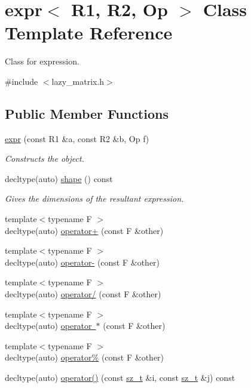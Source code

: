 \hypertarget{classexpr}{}\section{expr$<$ R1, R2, Op $>$ Class Template Reference}
\label{classexpr}


Class for expression.  




{\ttfamily \#include $<$lazy\+\_\+matrix.\+h$>$}

\subsection*{Public Member Functions}
\begin{DoxyCompactItemize}
\item 
\mbox{\hyperlink{classexpr_a88ac75b254c2838f389ad61101abb7f4}{expr}} (const R1 \&a, const R2 \&b, Op f)
\begin{DoxyCompactList}\small\item\em Constructs the object. \end{DoxyCompactList}\item 
decltype(auto) \mbox{\hyperlink{classexpr_aa61617d3e742a72e3ebbe3e289c32818}{shape}} () const
\begin{DoxyCompactList}\small\item\em Gives the dimensions of the resultant expression. \end{DoxyCompactList}\item 
{\footnotesize template$<$typename F $>$ }\\decltype(auto) \mbox{\hyperlink{classexpr_a252251779aa235aed7a5a7fec6ebe995}{operator+}} (const F \&other)
\item 
{\footnotesize template$<$typename F $>$ }\\decltype(auto) \mbox{\hyperlink{classexpr_ab46b7e78ad487b606b12e81c24cb3eeb}{operator-\/}} (const F \&other)
\item 
{\footnotesize template$<$typename F $>$ }\\decltype(auto) \mbox{\hyperlink{classexpr_abf2a263cd1346fe818d886cdc94ae4d0}{operator/}} (const F \&other)
\item 
{\footnotesize template$<$typename F $>$ }\\decltype(auto) \mbox{\hyperlink{classexpr_a7a78d4cfe0e97d19946a2ffb80882978}{operator $\ast$}} (const F \&other)
\item 
{\footnotesize template$<$typename F $>$ }\\decltype(auto) \mbox{\hyperlink{classexpr_abb42fe3353cc4446cf4cdae9e51ecb63}{operator\%}} (const F \&other)
\item 
decltype(auto) \mbox{\hyperlink{classexpr_a095b81efbf9ed48db95750cd726460a2}{operator()}} (const \mbox{\hyperlink{lazy__matrix_8h_acba2745dcfc55b2d05ff45adc6a0a015}{sz\+\_\+t}} \&i, const \mbox{\hyperlink{lazy__matrix_8h_acba2745dcfc55b2d05ff45adc6a0a015}{sz\+\_\+t}} \&j) const
\end{DoxyCompactItemize}


